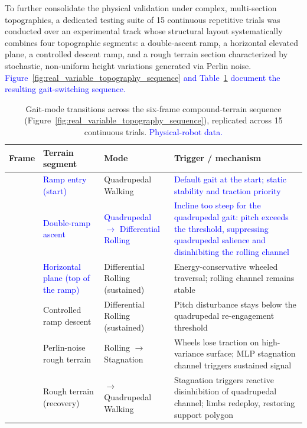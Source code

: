 \documentclass[preprint,12pt]{elsarticle}
\newcommand{\revblue}[1]{\textcolor{blue}{#1}}
\begin{document}
To further consolidate the physical validation under complex, multi-section topographies, a dedicated testing suite of 15 continuous repetitive trials was conducted over an experimental track whose structural layout systematically combines four topographic segments: a double-ascent ramp, a horizontal elevated plane, a controlled descent ramp, and a rough terrain section characterized by stochastic, non-uniform height variations generated via Perlin noise. \revblue{Figure~\ref{fig:real_variable_topography_sequence} and Table~\ref{tab:terrain_sequence} document the resulting gait-switching sequence.}

\begin{table}[htbp]
\centering
\caption{Gait-mode transitions across the six-frame compound-terrain sequence (Figure~\ref{fig:real_variable_topography_sequence}), replicated across 15 continuous trials. \revblue{Physical-robot data.}}
\label{tab:terrain_sequence}
\begin{tabularx}{\textwidth}{>{\centering\arraybackslash}p{} >{\raggedright\arraybackslash}p{} >{\raggedright\arraybackslash}p{} >{\raggedright\arraybackslash}X}
\toprule
\textbf{Frame} & \textbf{Terrain segment} & \textbf{Mode} & \textbf{Trigger / mechanism} \\
\midrule
1 & \revblue{Ramp entry (start)} & Quadrupedal Walking & \revblue{Default gait at the start; static stability and traction priority} \\
2 & \revblue{Double-ramp ascent} & \revblue{Quadrupedal $\rightarrow$ Differential Rolling} & \revblue{Incline too steep for the quadrupedal gait: pitch exceeds the threshold, suppressing quadrupedal salience and disinhibiting the rolling channel} \\
3 & \revblue{Horizontal plane (top of the ramp)} & Differential Rolling (sustained) & Energy-conservative wheeled traversal; rolling channel remains stable \\
4 & Controlled ramp descent & Differential Rolling (sustained) & Pitch disturbance stays below the quadrupedal re-engagement threshold \\
5 & Perlin-noise rough terrain & Rolling $\rightarrow$ Stagnation & Wheels lose traction on high-variance surface; MLP stagnation channel triggers sustained signal \\
6 & Rough terrain (recovery) & $\rightarrow$ Quadrupedal Walking & Stagnation triggers reactive disinhibition of quadrupedal channel; limbs redeploy, restoring support polygon \\
\bottomrule
\end{tabularx}
\end{table}
\end{document}
